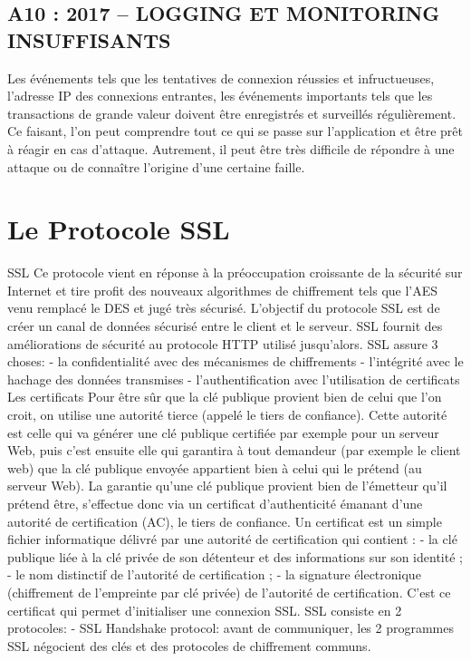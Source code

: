 \subsection*{A10 : 2017 – LOGGING ET MONITORING INSUFFISANTS}
Les événements tels que les tentatives de connexion réussies et infructueuses, l'adresse IP des connexions entrantes, les événements importants tels que les transactions de grande valeur doivent être enregistrés et surveillés régulièrement. Ce faisant, l’on peut comprendre tout ce qui se passe sur l’application et être prêt à réagir en cas d’attaque. Autrement, il peut être très difficile de répondre à une attaque ou de connaître l’origine d’une certaine faille.

\section{Le Protocole SSL}
SSL
Ce protocole vient en réponse à la préoccupation croissante de la sécurité sur Internet et tire profit des nouveaux algorithmes de chiffrement tels que l’AES venu remplacé le DES et jugé très sécurisé. 
L’objectif du protocole SSL est de créer un canal de données sécurisé entre le client et le serveur. SSL fournit des améliorations de sécurité au protocole HTTP utilisé jusqu’alors. 
SSL assure 3 choses:
-	la confidentialité avec des mécanismes de chiffrements
-	l’intégrité avec le hachage des données transmises
-	l’authentification avec l’utilisation de certificats
Les certificats 
Pour être sûr que la clé publique provient bien de celui que l'on croit, on utilise une autorité tierce (appelé le tiers de confiance). Cette autorité est celle qui va générer une clé publique certifiée par exemple pour un serveur Web, puis c'est ensuite elle qui garantira à tout demandeur (par exemple le client web) que la clé publique envoyée appartient bien à celui qui le prétend (au serveur Web).
La garantie qu'une clé publique provient bien de l'émetteur qu'il prétend être, s'effectue donc via un certificat d'authenticité émanant d'une autorité de certification (AC), le tiers de confiance.
Un certificat est un simple fichier informatique délivré par une autorité de certification qui contient :
-	la clé publique liée à la clé privée de son détenteur et des informations sur son identité ;
-	le nom distinctif de l'autorité de certification ;
-	la signature électronique (chiffrement de l'empreinte par clé privée) de l'autorité de certification.
C’est ce certificat qui permet d’initialiser une connexion SSL.
SSL consiste en 2 protocoles:
-	SSL Handshake protocol: avant de communiquer, les 2 programmes SSL négocient des clés et des protocoles de chiffrement communs.
